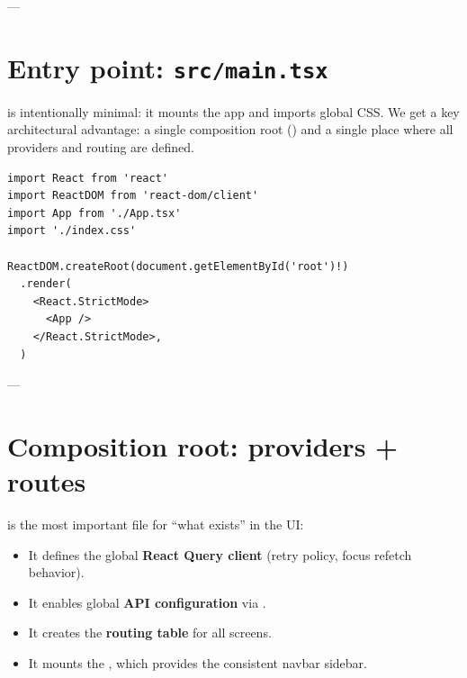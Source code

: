 ---

\section{Entry point: \texttt{src/main.tsx}}
\label{sec:entry-point}

 is intentionally minimal: it mounts the app and imports global CSS. We get a key architectural advantage: a single composition root () and a single place where all providers and routing are defined.

\begin{listing}[htbp]
\caption{Browser entry point --- mounting React}
\label{lst:ch21-main}
\begin{verbatim}
import React from 'react'
import ReactDOM from 'react-dom/client'
import App from './App.tsx'
import './index.css'

ReactDOM.createRoot(document.getElementById('root')!)
  .render(
    <React.StrictMode>
      <App />
    </React.StrictMode>,
  )
\end{verbatim}
\end{listing}

---

\section{Composition root: providers + routes}
\label{sec:composition-root}

 is the most important file for ``what exists'' in the UI:

\begin{itemize}
  \item It defines the global \textbf{React Query client} (retry policy, focus refetch behavior).
  \item It enables global \textbf{API configuration} via .
  \item It creates the \textbf{routing table} for all screens.
  \item It mounts the , which provides the consistent navbar \code{+} sidebar.
\end{itemize}

